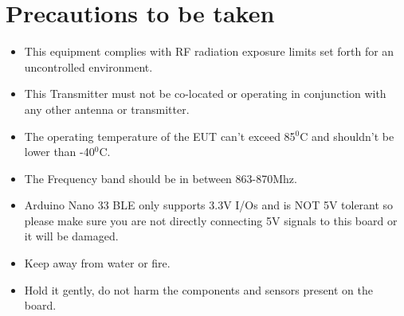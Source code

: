 %
%



\chapter{Precautions to be taken}
\begin{itemize}
	
	\item This equipment complies with RF radiation exposure limits set forth for an uncontrolled environment.
	\item This Transmitter must not be co-located or operating in conjunction with any other antenna or transmitter.
	\item The operating temperature of the EUT can't exceed 85$^{0}$C and shouldn't be lower than -40$^{0}$C.
	\item The Frequency band should be in between 863-870Mhz.
	\item Arduino Nano 33 BLE only supports 3.3V I/Os and is NOT 5V tolerant so please make sure you are not directly connecting 5V signals to this board or it will be damaged.
	\item Keep away from water or fire.
	\item Hold it gently, do not harm the components and sensors present on the board.
	
\end{itemize}
